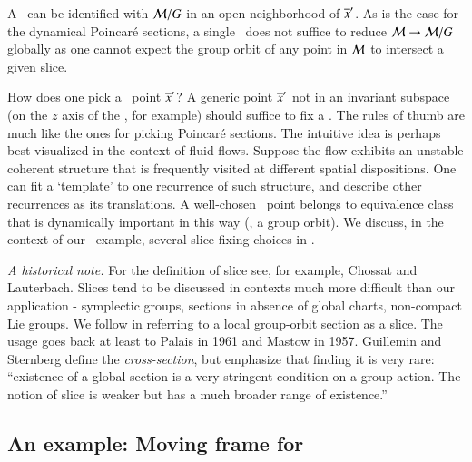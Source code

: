 \documentclass[preprint,number,sort&compress]{elsarticle}
\begin{document}
A \slice\ can be identified with ${\cal M}/G$ in an open
neighborhood of ${\overline{x}'}$. As is the case for the dynamical
Poincar\'e sections, a single \slice\ does not
suffice to reduce ${\cal M} \to {\cal M}/G$ globally as
 one cannot expect the group orbit
of any point in ${\cal M}$ to intersect a given slice.

How does one pick a \slice\ point ${\overline{x}'}$? A generic point
${\overline{x}'} $ not in an in\-vari\-ant subspace (on the $z$
axis of the \cLe, for example) should suffice to fix a \slice.
The rules of thumb are much like the ones for picking
Poincar\'e sections. The intuitive
idea is perhaps best visualized in the context of fluid
flows. Suppose the flow exhibits an unstable coherent
structure that {is frequently visited at}
different spatial dispositions. One can fit a `template' to one
recurrence of such structure, and describe other recurrences
as its translations. A well-chosen \slice\ point belongs to
{equivalence class that is dynamically important in
this way} (\ie, a group orbit).
We discuss, in the context of our \cLe\ example, several slice fixing
choices in .

\emph{A historical note.}
For the definition of slice see, for example,  Chossat and
Lauterbach. Slices tend to be discussed in
contexts much more difficult than our application -
symplectic groups, sections in absence of global charts,
non-compact Lie groups. We follow
 in referring to a local
group-orbit section as a slice. The usage goes back at least
to Palais in 1961 and Mastow in 1957.
Guillemin and Sternberg define the
\emph{cross-section}, but emphasize that finding it is very
rare: ``existence of a global section is a very stringent
condition on a group action. The notion of slice is weaker
but has a much broader range of existence.''


\subsection{\label{sec:CLeMovFr}An example: Moving frame for \cLe}
\end{document}
